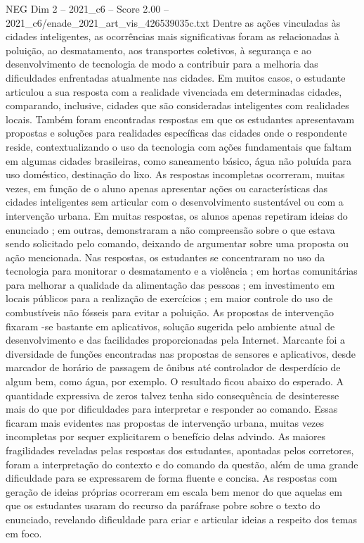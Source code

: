 \begin{textsample}{NEG Dim 2 – 2021\_c6 – Score 2.00 – 2021\_c6/enade\_2021\_art\_vis\_426539035c.txt}
Dentre as ações vinculadas às cidades inteligentes, as ocorrências mais significativas foram as relacionadas à poluição, ao desmatamento, aos transportes coletivos, à segurança e ao desenvolvimento de tecnologia de modo a contribuir para a melhoria das dificuldades enfrentadas atualmente nas cidades.
Em muitos casos, o estudante articulou a sua resposta com a realidade vivenciada em determinadas cidades, comparando, inclusive, cidades que são consideradas inteligentes com realidades locais.
Também foram encontradas respostas em que os estudantes apresentavam propostas e soluções para realidades específicas das cidades onde o respondente reside, contextualizando o uso da tecnologia com ações fundamentais que faltam em algumas cidades brasileiras, como saneamento básico, água não poluída para uso doméstico, destinação do lixo.
As respostas incompletas ocorreram, muitas vezes, em função de o aluno apenas apresentar ações ou características das cidades inteligentes sem articular com o desenvolvimento sustentável ou com a intervenção urbana.
Em muitas respostas, os alunos apenas repetiram ideias do enunciado ; em outras, demonstraram a não compreensão sobre o que estava sendo solicitado pelo comando, deixando de argumentar sobre uma proposta ou ação mencionada.
Nas respostas, os estudantes se concentraram no uso da tecnologia para monitorar o desmatamento e a violência ; em hortas comunitárias para melhorar a qualidade da alimentação das pessoas ; em investimento em locais públicos para a realização de exercícios ; em maior controle do uso de combustíveis não fósseis para evitar a poluição.
As propostas de intervenção fixaram -se bastante em aplicativos, solução sugerida pelo ambiente atual de desenvolvimento e das facilidades proporcionadas pela Internet.
Marcante foi a diversidade de funções encontradas nas propostas de sensores e aplicativos, desde marcador de horário de passagem de ônibus até controlador de desperdício de algum bem, como água, por exemplo.
O resultado ficou abaixo do esperado.
A quantidade expressiva de zeros talvez tenha sido consequência de desinteresse mais do que por dificuldades para interpretar e responder ao comando.
Essas ficaram mais evidentes nas propostas de intervenção urbana, muitas vezes incompletas por sequer explicitarem o benefício delas advindo.
As maiores fragilidades reveladas pelas respostas dos estudantes, apontadas pelos corretores, foram a interpretação do contexto e do comando da questão, além de uma grande dificuldade para se expressarem de forma fluente e concisa.
As respostas com geração de ideias próprias ocorreram em escala bem menor do que aquelas em que os estudantes usaram do recurso da paráfrase pobre sobre o texto do enunciado, revelando dificuldade para criar e articular ideias a respeito dos temas em foco.

\end{textsample}
